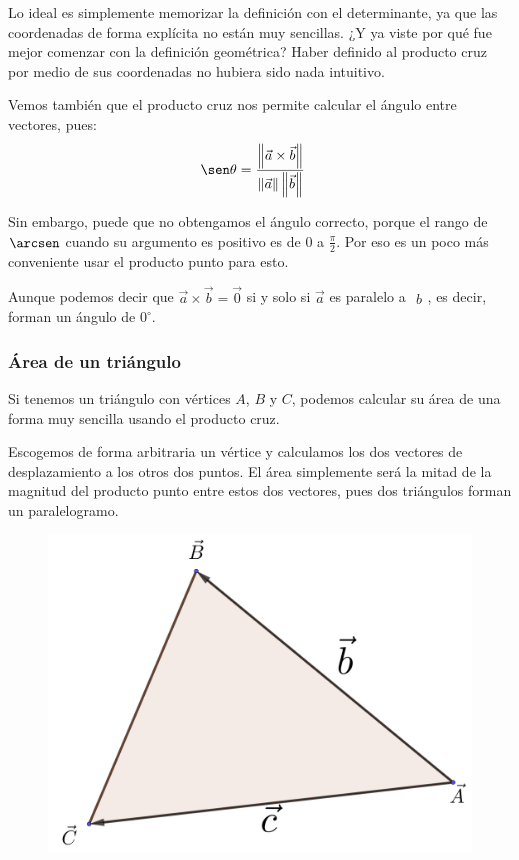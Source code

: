 \documentclass[12pt, fleqn]{report}                             %
\theoremstyle{break}                                            %
\newcommand{\Abs}[1]{\left\lVert #1 \right\lVert}               %
\newcommand{\Vector}[1]                                         %
        { \ensuremath{\begin{matrix}#1\end{matrix}} }               %
\begin{document}
            Lo ideal es simplemente memorizar la definición con el determinante, ya que las coordenadas de forma explícita no están muy sencillas. ¿Y ya viste por qué fue mejor comenzar con la definición geométrica? Haber definido al producto cruz por medio de sus coordenadas no hubiera sido nada intuitivo.
            
            Vemos también que el producto cruz nos permite calcular el ángulo entre vectores, pues:
            \begin{align}
                \sen \theta &= \dfrac{\Abs{\vec{a} \times \vec{b}}}{\Abs{\vec{a}} \Abs{\vec{b}}}
            \end{align}
            
            Sin embargo, puede que no obtengamos el ángulo correcto, porque el rango de $\arcsen$ cuando su argumento es positivo es de $0$ a $\frac{\pi}{2}$. Por eso es un poco más conveniente usar el producto punto para esto.
            
            Aunque podemos decir que $\vec{a} \times \vec{b} = \vec{0}$ si y solo si $\vec{a}$ es paralelo a $\Vector{b}$, es decir, forman un ángulo de $0^\circ$.
        
            \clearpage
        
            \subsubsection{Área de un triángulo}
            
            Si tenemos un triángulo con vértices $A$, $B$ y $C$, podemos calcular su área de una forma muy sencilla usando el producto cruz.
            
            Escogemos de forma arbitraria un vértice y calculamos los dos vectores de desplazamiento a los otros dos puntos. El área simplemente será la mitad de la magnitud del producto punto entre estos dos vectores, pues dos triángulos forman un paralelogramo.
            
            \begin{figure}[H]
                \centering
                \includegraphics[scale=1.3]{triangle.png}
            \end{figure}
            
\end{document}
